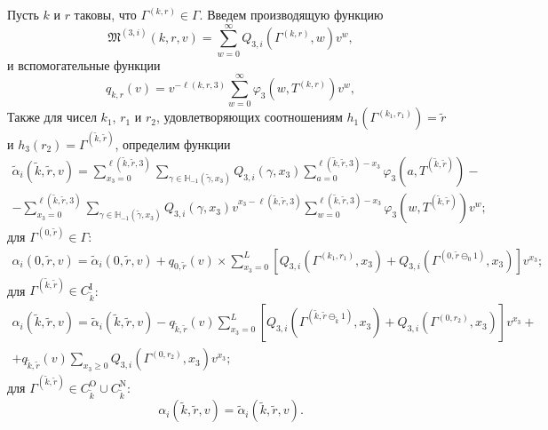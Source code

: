 Пусть $k$ и $r$ таковы,  что $\Gamma^{(k, r)}\in \Gamma$. Введем производящую функцию
\begin{equation*}
\mathfrak{M}^{(3, i)}(k, r, v) = \sum_{w=0}^{\infty} Q_{3, i}(\Gamma^{(k, r)}, w) v^w, 
\end{equation*}
и вспомогательные функции
\begin{equation*}
q_{k, r}(v) = v^{-\ell(k, r, 3)}\sum_{w=0}^{\infty} \varphi_3(w, T^{(k, r)})v^w,
\end{equation*}
Также для чисел $k_1$,  $r_1$ и $r_2$,  удовлетворяющих соотношениям $h_1(\Gamma^{(k_1, r_1)}) = \tilde{r}$ и $h_3(r_2)=\Gamma^{(\tilde{k}, \tilde{r})}$,  определим функции
\begin{multline}
\tilde{\alpha}_i(\tilde{k}, \tilde{r}, v) = \sum_{x_3=0}^{\ell(\tilde{k}, \tilde{r}, 3)}\sum_{\gamma \in {\mathbb H}_{-1}(\tilde{\gamma}, x_3)} Q_{3, i}(\gamma, x_3) \sum_{a=0}^{\ell(\tilde{k}, \tilde{r}, 3) - x_3} \varphi_3(a, T^{(\tilde{k}, \tilde{r})}) - \\
- \sum_{x_3=0}^{\ell(\tilde{k}, \tilde{r}, 3)}  \sum_{\gamma \in {\mathbb H}_{-1}(\tilde{\gamma}, x_3)} Q_{3, i}(\gamma, x_3) v^{x_3-\ell(\tilde{k}, \tilde{r}, 3)}  \sum_{w=0}^{\ell(\tilde{k}, \tilde{r}, 3) -x_3}
\varphi_3(w, T^{(\tilde{k}, \tilde{r})}) v^w;
\end{multline}
для $\Gamma^{(0, \tilde{r})} \in \Gamma$:
\begin{multline}
\alpha_i(0, \tilde{r}, v) =\tilde{\alpha}_i(0, \tilde{r}, v) + q_{0, \tilde{r}}(v) \times \sum_{x_3=0}^{L} \left[ Q_{3, i}(\Gamma^{(k_1, r_1)}, x_3) + Q_{3, i}(\Gamma^{(0, \tilde{r}\ominus_0 1)}, x_3) \right] v^{x_3}; \end{multline}
для $ \Gamma^{(\tilde{k},  \tilde{r})} \in C_{\tilde{k}}^{\mathrm{I}}$:
\begin{multline}
\alpha_i(\tilde{k}, \tilde{r}, v) =\tilde{\alpha}_i(\tilde{k}, \tilde{r}, v) - q_{\tilde{k}, \tilde{r}}(v)\sum_{x_3=0}^{L} \left[ Q_{3, i}(\Gamma^{(\tilde{k}, \tilde{r}\ominus_{\tilde{k}} 1)}, x_3) + Q_{3, i}(\Gamma^{(0, r_2)}, x_3) \right] v^{x_3}+ \\ 
+ q_{\tilde{k}, \tilde{r}}(v)  \sum_{x_3\geqslant 0} Q_{3, i}(\Gamma^{(0, r_2)}, x_3) v^{x_3};
\end{multline}
для $\Gamma^{(\tilde{k},  \tilde{r})} \in C_{\tilde{k}}^{\mathrm{O}} \cup C_{\tilde{k}}^{\mathrm{N}}$:
\begin{equation}
\alpha_i(\tilde{k}, \tilde{r}, v) =\tilde{\alpha}_i(\tilde{k}, \tilde{r}, v).
\end{equation}

